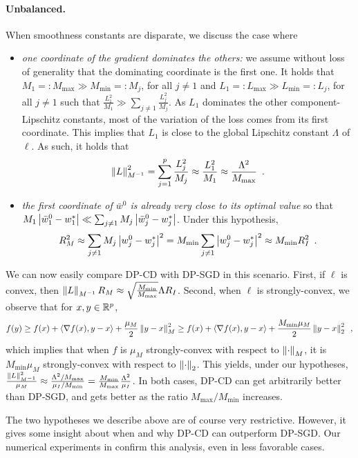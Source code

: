 \paragraph{Unbalanced.}
When smoothness constants are disparate, we discuss the case where
\begin{itemize}
  \item \textit{one coordinate of the gradient dominates the others:}
        we assume without loss of generality that the dominating coordinate is the first one.
        It holds that $M_1 =: M_{\max} \gg M_{\min} =: M_j$, for all $j \neq 1$ and
        $L_1 =: L_{\max} \gg L_{\min} =: L_j$, for all $j \neq 1$ such that
        $\frac{L_1^2}{M_1} \gg \sum_{j\neq 1} \frac{L_j^2}{M_j}$.
        As $L_1$ dominates the other component-Lipschitz constants, most of the variation of the loss comes from its first coordinate.
        This implies that $L_1$ is close to the global Lipschitz constant $\Lambda$ of $\ell$.
        As such, it holds that
        \begin{align}
          \left \lVert L \right \rVert_{M^{-1}}^2
          =
          \sum_{j=1}^p \frac{L_j^2}{M_j}
          \approx \frac{L_1^2}{M_1}
          \approx \frac{\Lambda^2}{M_{\max}}\enspace.
        \end{align}
  \item \textit{the first coordinate of $\bar w^0$ is already very close to
          its optimal value}
        so that $M_1\left| \bar w^0_1 - w^*_1 \right| \ll \sum_{j \neq 1} M_j \left| \bar w^0_j - w^*_j \right|$.
        Under this hypothesis,
        \begin{align}
          R_M^2
          \approx \sum_{j\neq 1}M_j\left| w_j^0 - w_j^* \right|^2
          = M_{\min} \sum_{j\neq 1}\left| w_j^0 - w_j^* \right|^2
          \approx M_{\min} R_I^2\enspace.
        \end{align}
\end{itemize}
We can now easily compare DP-CD with DP-SGD in this scenario.
First, if $\ell$ is convex, then
$\left \lVert L \right \rVert_{M^{-1}} R_M \approx \sqrt{\frac{M_{\min}}{M_{\max}}} \Lambda R_I$.
Second, when $\ell$ is strongly-convex, we observe that for $x, y \in \mathbb R^p$,
\begin{align}
  f(y)
  \ge f(x) + \left\langle \nabla f(x), y - x \right\rangle + \frac{\mu_M}{2} \left \lVert y - x \right \rVert_M^2
  \ge f(x) + \left\langle \nabla f(x), y - x \right\rangle + \frac{M_{\min} \mu_M}{2} \left \lVert y - x \right \rVert_2^2\enspace,
\end{align}
which implies that when $f$ is $\mu_M$ strongly-convex with respect to
$\left \lVert \cdot \right \rVert_M$, it is $M_{\min}\mu_M$ strongly-convex with respect
to $\left \lVert \cdot \right \rVert_2$.  This yields, under our hypotheses,
$\frac{\left \lVert L \right \rVert_{M^{-1}}^2}{\mu_M} \approx \frac{\Lambda^2 /
  M_{\max}}{\mu_I / M_{\min}} = \frac{M_{\min}}{M_{\max}}
\frac{\Lambda^2}{\mu_I}$.
In both cases, DP-CD can get arbitrarily better than DP-SGD, and gets
better as the ratio ${M_{\max}}/{M_{\min}}$ increases.




The two hypotheses we describe above are of course very restrictive.
However, it gives some insight about when and why DP-CD can outperform
DP-SGD.
Our numerical experiments in  confirm this
analysis, even in less favorable
cases.













